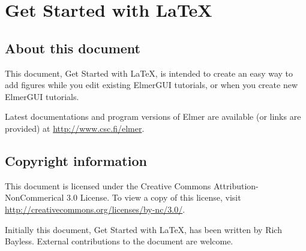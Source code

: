 \chapter*{Get Started with LaTeX}

\section*{About this document}

This document, Get Started with LaTeX, is intended to create an easy
way to add figures while you edit existing ElmerGUI tutorials, or when
you create new ElmerGUI tutorials. 

Latest documentations and program versions of Elmer are available (or links are provided) at 
\url{http://www.csc.fi/elmer}. 

\section*{Copyright information}

This document is licensed under the Creative Commons Attribution-NonCommerical 3.0 License. 
To view a copy of this license, visit \url{http://creativecommons.org/licenses/by-nc/3.0/}.

Initially this document, Get Started with LaTeX, has been written by Rich Bayless.
External contributions to the document are welcome.



